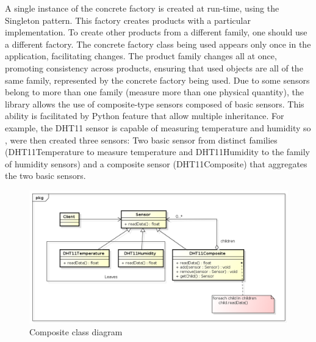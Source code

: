 \documentclass{acm_proc_article-sp}
\begin{document}
A single instance of the concrete factory is created at run-time, using the Singleton pattern. This factory creates products with a particular implementation. To create other products from a different family, one should use a different factory. The concrete factory class being used appears only once in the application, facilitating changes. The product family changes all at once, promoting consistency across products, ensuring that used objects are all of the same family, represented by the concrete factory being used.
\newline
\newline
Due to some sensors belong to more than one family (measure more than one physical quantity), the library allows the use of composite-type sensors composed of basic sensors. This ability is facilitated by Python feature that allow multiple inheritance. For example, the DHT11 sensor is capable of measuring temperature and humidity so , were then created three sensors: Two basic sensor from distinct families (DHT11Temperature to measure temperature and DHT11Humidity to the family of humidity sensors) and a composite sensor (DHT11Composite) that aggregates the two basic sensors.
\begin{figure}[ht]
    \includegraphics[width=1.0\textwidth,natwidth=610,natheight=642]{pictures/composite.png}
    \caption{Composite class diagram}
    \label{fig:composite}
\end{figure}
\end{document}
